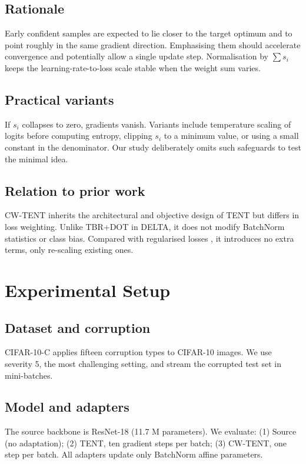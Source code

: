 \documentclass{article} %
\begin{document}
\subsection{Rationale}
Early confident samples are expected to lie closer to the target optimum and to point roughly in the same gradient direction. Emphasising them should accelerate convergence and potentially allow a single update step. Normalisation by \(\sum s_i\) keeps the learning-rate-to-loss scale stable when the weight sum varies.

\subsection{Practical variants}
If \(s_i\) collapses to zero, gradients vanish. Variants include temperature scaling of logits before computing entropy, clipping \(s_i\) to a minimum value, or using a small constant in the denominator. Our study deliberately omits such safeguards to test the minimal idea.

\subsection{Relation to prior work}
CW-TENT inherits the architectural and objective design of TENT but differs in loss weighting. Unlike TBR+DOT in DELTA, it does not modify BatchNorm statistics or class bias. Compared with regularised losses \cite{author-year-test}, it introduces no extra terms, only re-scaling existing ones.

\section{Experimental Setup}
\label{sec:experimental}
\subsection{Dataset and corruption}
CIFAR-10-C applies fifteen corruption types to CIFAR-10 images. We use severity 5, the most challenging setting, and stream the corrupted test set in mini-batches.

\subsection{Model and adapters}
The source backbone is ResNet-18 (11.7 M parameters). We evaluate: (1) Source (no adaptation); (2) TENT, ten gradient steps per batch; (3) CW-TENT, one step per batch. All adapters update only BatchNorm affine parameters.
\end{document}
